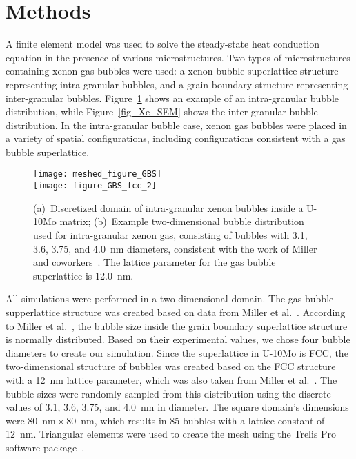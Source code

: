 \section{Methods} \label{sec:Methodology}
A finite element model was used to solve the steady-state heat conduction equation in the presence of various microstructures. Two types of microstructures containing xenon gas bubbles were used: a xenon bubble superlattice structure representing intra-granular bubbles, and a grain boundary structure representing inter-granular bubbles. Figure~\ref{gbs} shows an example of an intra-granular bubble distribution, while Figure~\ref{fig_Xe_SEM} shows the inter-granular bubble distribution.
In the intra-granular bubble case, xenon gas bubbles were placed in a variety
of spatial configurations, including configurations consistent with a gas bubble superlattice.
\begin{figure}%
    \centering
	  \texttt{[image: meshed\_figure\_GBS]}
    \\
	 \texttt{[image: figure\_GBS\_fcc\_2]}
	\caption[Discreteized domain of intra-granualr xenon bubble]{(a)~Discretized domain of intra-granular xenon bubbles inside a U-10Mo matrix; (b)~Example two-dimensional bubble distribution 
used for intra-granular xenon gas, consisting of bubbles with 3.1, 3.6, 3.75,
        and 4.0~nm diameters, consistent with the work of Miller and
        coworkers~\cite{miller2015transmission}. The lattice parameter for the
        gas bubble superlattice is 12.0~nm.}
	\label{gbs}
\end{figure}
All simulations were performed in a two-dimensional domain. The gas bubble supperlattice structure was created based on data from Miller et al.~\cite{miller2015transmission}. According to Miller et al.~\cite{miller2015transmission}, the bubble size inside the grain boundary superlattice structure is normally distributed. Based on their experimental values, we chose four bubble diameters to create our simulation. Since the superlattice in U-10Mo is FCC, the two-dimensional structure of bubbles was created based on the FCC structure with a 12~nm lattice parameter, which was also taken from Miller et al.~\cite{miller2015transmission}. The bubble sizes were randomly sampled from this distribution using the discrete values of 3.1, 3.6, 3.75, and 4.0~nm in diameter. The square domain's dimensions were 80~nm${}\times{}$80~nm, which results in 85 bubbles with a lattice constant of 12~nm. Triangular elements were used to create the mesh using the Trelis Pro software package~\cite{trelis}.


